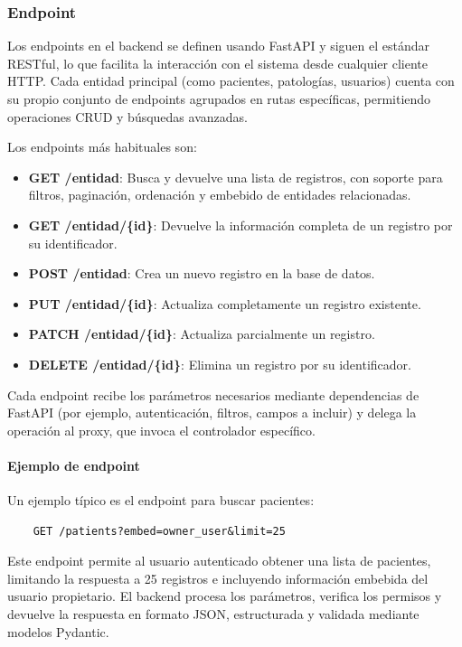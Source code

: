 \documentclass[12pt, a4paper]{article}
\begin{document}
\subsubsection{Endpoint}

Los endpoints en el backend se definen usando FastAPI y siguen el estándar RESTful, lo que facilita la interacción con el sistema desde cualquier cliente HTTP. Cada entidad principal (como pacientes, patologías, usuarios) cuenta con su propio conjunto de endpoints agrupados en rutas específicas, permitiendo operaciones CRUD y búsquedas avanzadas.

Los endpoints más habituales son:
\begin{itemize}
	\item \textbf{GET /entidad}: Busca y devuelve una lista de registros, con soporte para filtros, paginación, ordenación y embebido de entidades relacionadas.
	\item \textbf{GET /entidad/\{id\}}: Devuelve la información completa de un registro por su identificador.
	\item \textbf{POST /entidad}: Crea un nuevo registro en la base de datos.
	\item \textbf{PUT /entidad/\{id\}}: Actualiza completamente un registro existente.
	\item \textbf{PATCH /entidad/\{id\}}: Actualiza parcialmente un registro.
	\item \textbf{DELETE /entidad/\{id\}}: Elimina un registro por su identificador.
\end{itemize}

Cada endpoint recibe los parámetros necesarios mediante dependencias de FastAPI (por ejemplo, autenticación, filtros, campos a incluir) y delega la operación al proxy, que invoca el controlador específico.

\paragraph{Ejemplo de endpoint}

Un ejemplo típico es el endpoint para buscar pacientes:

\begin{verbatim}
	GET /patients?embed=owner_user&limit=25
\end{verbatim}

Este endpoint permite al usuario autenticado obtener una lista de pacientes, limitando la respuesta a 25 registros e incluyendo información embebida del usuario propietario. El backend procesa los parámetros, verifica los permisos y devuelve la respuesta en formato JSON, estructurada y validada mediante modelos Pydantic.
\end{document}
